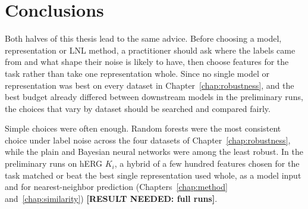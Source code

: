 \section{Conclusions}\label{sec:discussion:conclusions}

Both halves of this thesis lead to the same advice. Before choosing a model, representation or LNL method, a practitioner should ask where the labels came from and what shape their noise is likely to have, then choose features for the task rather than take one representation whole. Since no single model or representation was best on every dataset in Chapter~\ref{chap:robustness}, and the best budget already differed between downstream models in the preliminary runs, the choices that vary by dataset should be searched and compared fairly.

Simple choices were often enough. Random forests were the most consistent choice under label noise across the four datasets of Chapter~\ref{chap:robustness}, while the plain and Bayesian neural networks were among the least robust. In the preliminary runs on hERG $K_i$, a hybrid of a few hundred features chosen for the task matched or beat the best single representation used whole, as a model input and for nearest-neighbor prediction (Chapters~\ref{chap:method} and~\ref{chap:similarity}) \textbf{[RESULT NEEDED: full runs]}.

